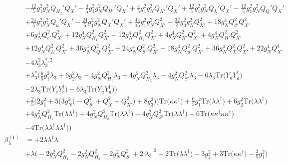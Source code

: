 {\begin{align}
 &-\frac{12}{5} g_{1}^{2} g_{N}^{2} Q_{H_2}' Q_X' -\frac{4}{5} g_{1}^{2} g_{N}^{2} Q_{\bar{H}'}' Q_X' +\frac{4}{5} g_{1}^{2} g_{N}^{2} Q_{H'}' Q_X' +\frac{12}{5} g_{1}^{2} g_{N}^{2} Q_L' Q_X' -\frac{12}{5} g_{1}^{2} g_{N}^{2} Q_Q' Q_X' \nonumber \\ 
 &+\frac{24}{5} g_{1}^{2} g_{N}^{2} Q_u' Q_X' -\frac{24}{5} g_{1}^{2} g_{N}^{2} Q_{\bar{X}}' Q_X' +\frac{44}{15} g_{1}^{2} g_{N}^{2} Q_{X'}^{2} +\frac{32}{3} g_{3}^{2} g_{N}^{2} Q_{X'}^{2} +18 g_{N}^{4} Q_{d'}^{2} Q_{X'}^{2} \nonumber \\ 
 &+6 g_{N}^{4} Q_{e'}^{2} Q_{X'}^{2} +12 g_{N}^{4} Q_{H_1}^{2} Q_{X'}^{2} +12 g_{N}^{4} Q_{H_2}^{2} Q_{X'}^{2} +4 g_{N}^{4} Q_{\bar{H}'}^{2} Q_{X'}^{2} +4 g_{N}^{4} Q_{H'}^{2} Q_{X'}^{2} \nonumber \\ 
 &+12 g_{N}^{4} Q_{L'}^{2} Q_{X'}^{2} +36 g_{N}^{4} Q_{Q'}^{2} Q_{X'}^{2} +24 g_{N}^{4} Q_{S'}^{2} Q_{X'}^{2} +18 g_{N}^{4} Q_{u'}^{2} Q_{X'}^{2} +36 g_{N}^{4} Q_{\bar{X}}^{2} Q_{X'}^{2} +22 g_{N}^{4} Q_{X'}^{4} \nonumber \\ 
 &-4 \lambda_{3}^{2} \lambda_{3}^{*,2} \nonumber \\ 
 &+\lambda_3^* \Big(\frac{6}{5} g_{1}^{2} \lambda_3 +6 g_{2}^{2} \lambda_3 +4 g_{N}^{2} Q_{H_1}^{2} \lambda_3 +4 g_{N}^{2} Q_{H_2}^{2} \lambda_3 -4 g_{N}^{2} Q_{S'}^{2} \lambda_3 -6 \lambda_3 \mbox{Tr}\Big({Y_d  Y_{d}^{\dagger}}\Big) \nonumber \\ 
 &-2 \lambda_3 \mbox{Tr}\Big({Y_e  Y_{e}^{\dagger}}\Big) -6 \lambda_3 \mbox{Tr}\Big({Y_u  Y_{u}^{\dagger}}\Big) \Big)\nonumber \\ 
 &+\frac{2}{5} \Big(2 g_{1}^{2}  + 5 \Big(3 g_{N}^{2} \Big(- Q_{S'}^{2}  + Q_{\bar{X}}^{2} + Q_{X'}^{2}\Big) + 8 g_{3}^{2} \Big)\Big)\mbox{Tr}\Big({\kappa  \kappa^{\dagger}}\Big) +\frac{6}{5} g_{1}^{2} \mbox{Tr}\Big({\lambda  \lambda^{\dagger}}\Big) +6 g_{2}^{2} \mbox{Tr}\Big({\lambda  \lambda^{\dagger}}\Big) \nonumber \\ 
 &+4 g_{N}^{2} Q_{H_1}^{2} \mbox{Tr}\Big({\lambda  \lambda^{\dagger}}\Big) +4 g_{N}^{2} Q_{H_2}^{2} \mbox{Tr}\Big({\lambda  \lambda^{\dagger}}\Big) -4 g_{N}^{2} Q_{S'}^{2} \mbox{Tr}\Big({\lambda  \lambda^{\dagger}}\Big) -6 \mbox{Tr}\Big({\kappa  \kappa^{\dagger}  \kappa  \kappa^{\dagger}}\Big) \nonumber \\ 
 &-4 \mbox{Tr}\Big({\lambda  \lambda^{\dagger}  \lambda  \lambda^{\dagger}}\Big) \Big)\\ 
\beta_{\lambda}^{(1)} & =  
+2 {\lambda  \lambda^{\dagger}  \lambda} \nonumber \\ 
 &+\lambda \Big(-2 g_{N}^{2} Q_{H_1}^{2}  -2 g_{N}^{2} Q_{H_2}^{2}  -2 g_{N}^{2} Q_{S'}^{2}  + 2 |\lambda_3|^2  + 2 \mbox{Tr}\Big({\lambda  \lambda^{\dagger}}\Big)  -3 g_{2}^{2}  + 3 \mbox{Tr}\Big({\kappa  \kappa^{\dagger}}\Big)  -\frac{3}{5} g_{1}^{2} \Big)\\ 

\end{align}}
